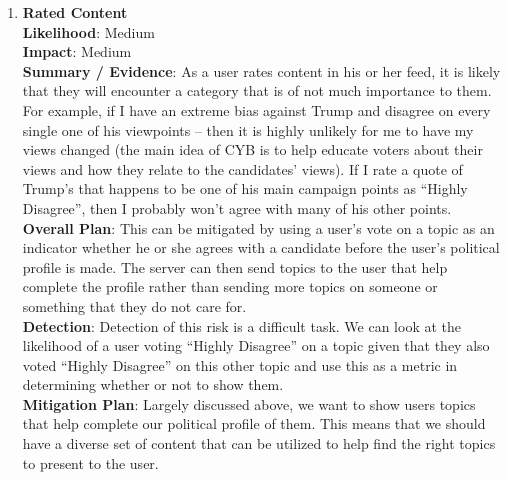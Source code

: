 \documentclass[11pt]{article}
\begin{document}
\begin{enumerate}[nolistsep]
    \item \textbf{Rated Content}\\
        \textbf{Likelihood}: Medium\\
        \textbf{Impact}: Medium\\
        \textbf{Summary / Evidence}: As a user rates content in his or her feed, it is likely that they will encounter a category that is of not much importance to them. For example, if I have an extreme bias against Trump and disagree on every single one of his viewpoints -- then it is highly unlikely for me to have my views changed (the main idea of CYB is to help educate voters about their views and how they relate to the candidates' views). If I rate a quote of Trump's that happens to be one of his main campaign points as ``Highly Disagree'', then I probably won't agree with many of his other points.\\
        \textbf{Overall Plan}: This can be mitigated by using a user's vote on a topic as an indicator whether he or she agrees with a candidate before the user's political profile is made. The server can then send topics to the user that help complete the profile rather than sending more topics on someone or something that they do not care for.\\
        \textbf{Detection}: Detection of this risk is a difficult task. We can look at the likelihood of a user voting ``Highly Disagree'' on a topic given that they also voted ``Highly Disagree'' on this other topic and use this as a metric in determining whether or not to show them.\\
        \textbf{Mitigation Plan}: Largely discussed above, we want to show users topics that help complete our political profile of them. This means that we should have a diverse set of content that can be utilized to help find the right topics to present to the user.
\end{enumerate}
\end{document}
